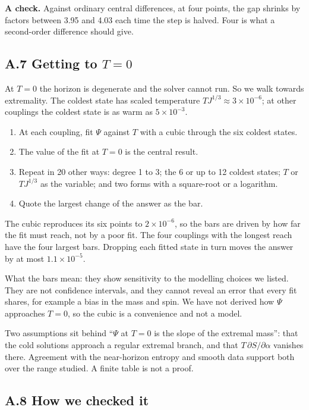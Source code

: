 \documentclass[12pt,a4paper]{article}
\begin{document}
\textbf{A check.} Against ordinary central differences, at four points, the gap
shrinks by factors between 3.95 and 4.03 each time the step is halved. Four is what
a second-order difference should give.

\subsection*{A.7 Getting to $T=0$}

At $T=0$ the horizon is degenerate and the solver cannot run. So we walk towards
extremality. The coldest state has scaled temperature $TJ^{1/3}\approx3\times10^{-6}$;
at other couplings the coldest state is as warm as $5\times10^{-3}$.
\begin{enumerate}[nosep]
\item At each coupling, fit $\Psi$ against $T$ with a cubic through the six coldest states.
\item The value of the fit at $T=0$ is the central result.
\item Repeat in 20 other ways: degree 1 to 3; the 6 or up to 12 coldest states; $T$ or
$TJ^{1/3}$ as the variable; and two forms with a square-root or a logarithm.
\item Quote the largest change of the answer as the bar.
\end{enumerate}
The cubic reproduces its six points to $2\times10^{-6}$, so the bars are driven by
how far the fit must reach, not by a poor fit. The four couplings with the longest
reach have the four largest bars. Dropping each fitted state in turn moves the answer
by at most $1.1\times10^{-5}$.

What the bars mean: they show sensitivity to the modelling choices we listed. They
are not confidence intervals, and they cannot reveal an error that every fit shares,
for example a bias in the mass and spin. We have not derived how $\Psi$ approaches
$T=0$, so the cubic is a convenience and not a model.

Two assumptions sit behind ``$\Psi$ at $T=0$ is the slope of the extremal mass'':
that the cold solutions approach a regular extremal branch, and that $T\,\partial S/\partial\alpha$
vanishes there. Agreement with the near-horizon entropy and smooth data support
both over the range studied. A finite table is not a proof.

\subsection*{A.8 How we checked it}
\end{document}
